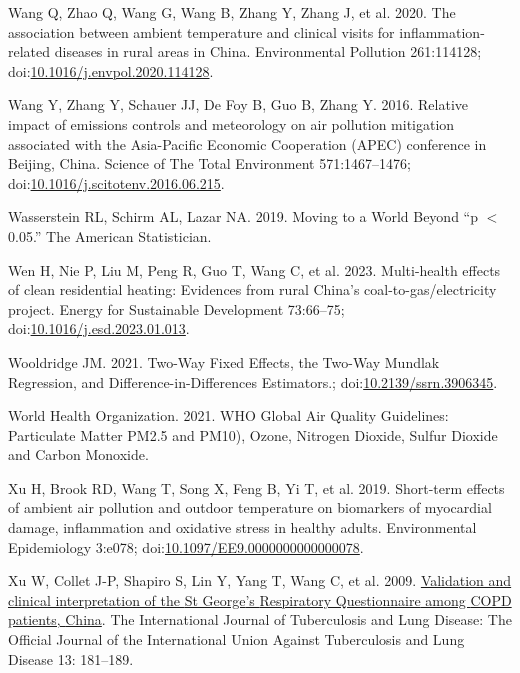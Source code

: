 \documentclass[
  letterpaper,
  DIV=11,
  numbers=noendperiod]{scrartcl}
\newlength{\cslhangindent}
\newenvironment{CSLReferences}[2] %
 {\begin{list}{}{%
  \setlength{\itemindent}{0pt}
  \setlength{\leftmargin}{0pt}
  \setlength{\parsep}{0pt}
  \ifodd #1
   \setlength{\leftmargin}{\cslhangindent}
   \setlength{\itemindent}{-1\cslhangindent}
  \fi
  \setlength{\itemsep}{#2\baselineskip}}}
 {\end{list}}
\begin{document}
\begin{CSLReferences}{1}{1}
Wang Q, Zhao Q, Wang G, Wang B, Zhang Y, Zhang J, et al. 2020. The
association between ambient temperature and clinical visits for
inflammation-related diseases in rural areas in {China}. Environmental
Pollution 261:114128;
doi:\href{https://doi.org/10.1016/j.envpol.2020.114128}{10.1016/j.envpol.2020.114128}.

Wang Y, Zhang Y, Schauer JJ, De Foy B, Guo B, Zhang Y. 2016. Relative
impact of emissions controls and meteorology on air pollution mitigation
associated with the {Asia-Pacific Economic Cooperation} ({APEC})
conference in {Beijing}, {China}. Science of The Total Environment
571:1467--1476;
doi:\href{https://doi.org/10.1016/j.scitotenv.2016.06.215}{10.1016/j.scitotenv.2016.06.215}.

Wasserstein RL, Schirm AL, Lazar NA. 2019. Moving to a {World Beyond}
{``p {\(<\)} 0.05.''} The American Statistician.

Wen H, Nie P, Liu M, Peng R, Guo T, Wang C, et al. 2023. Multi-health
effects of clean residential heating: {Evidences} from rural {China}'s
coal-to-gas/electricity project. Energy for Sustainable Development
73:66--75;
doi:\href{https://doi.org/10.1016/j.esd.2023.01.013}{10.1016/j.esd.2023.01.013}.

Wooldridge JM. 2021. Two-{Way Fixed Effects}, the {Two-Way Mundlak
Regression}, and {Difference-in-Differences Estimators}.;
doi:\href{https://doi.org/10.2139/ssrn.3906345}{10.2139/ssrn.3906345}.

World Health Organization. 2021. {WHO Global Air Quality Guidelines}:
{Particulate Matter PM2}.5 and {PM10}), {Ozone}, {Nitrogen Dioxide},
{Sulfur Dioxide} and {Carbon Monoxide}.

Xu H, Brook RD, Wang T, Song X, Feng B, Yi T, et al. 2019. Short-term
effects of ambient air pollution and outdoor temperature on biomarkers
of myocardial damage, inflammation and oxidative stress in healthy
adults. Environmental Epidemiology 3:e078;
doi:\href{https://doi.org/10.1097/EE9.0000000000000078}{10.1097/EE9.0000000000000078}.

Xu W, Collet J-P, Shapiro S, Lin Y, Yang T, Wang C, et al. 2009.
\href{https://www.ncbi.nlm.nih.gov/pubmed/19146745}{Validation and
clinical interpretation of the {St George}'s {Respiratory Questionnaire}
among {COPD} patients, {China}}. The International Journal of
Tuberculosis and Lung Disease: The Official Journal of the International
Union Against Tuberculosis and Lung Disease 13: 181--189.


\end{CSLReferences}
\end{document}
